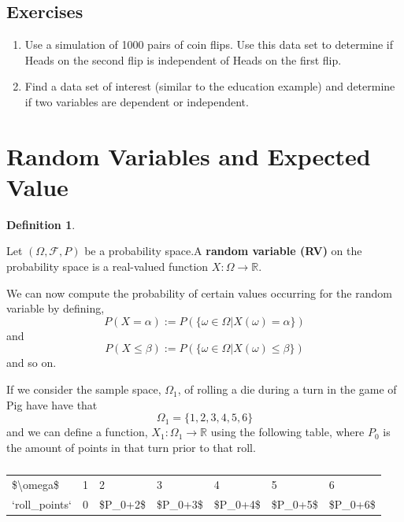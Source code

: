 \documentclass[
]{book}
\theoremstyle{definition}
\newtheorem{definition}{Definition}[chapter]
\theoremstyle{definition}
\theoremstyle{definition}
\theoremstyle{definition}
\theoremstyle{remark}
\begin{document}
\hypertarget{exercises-67}{%
\subsection{Exercises}\label{exercises-67}}

\begin{enumerate}
\def\labelenumi{\arabic{enumi}.}
\item
  Use a simulation of 1000 pairs of coin flips. Use this data set to determine if Heads on the second flip is independent of Heads on the first flip.
\item
  Find a data set of interest (similar to the education example) and determine if two variables are dependent or independent.
\end{enumerate}

\hypertarget{random-variables-and-expected-value}{%
\section{Random Variables and Expected Value}\label{random-variables-and-expected-value}}

\begin{definition}
\protect\hypertarget{def:unlabeled-div-314}{}\label{def:unlabeled-div-314}

Let \((\Omega, \mathcal{F}, P)\) be a probability space.A \textbf{random variable (RV)} on the probability space is a real-valued function \(X: \Omega \rightarrow \mathbb{R}\).

\end{definition}

We can now compute the probability of certain values occurring for the random variable by defining,
\[P(X=\alpha) := P(\{\omega \in \Omega \vert X(\omega)=\alpha \})\] and \[P(X\leq \beta) := P(\{\omega \in \Omega \vert X(\omega) \leq \beta\})\] and so on.

If we consider the sample space, \(\Omega_1\), of rolling a die during a turn in the game of Pig have have that
\[\Omega_1 = \{1,2,3,4,5,6\}\] and we can define a function, \(X_1:\Omega_1 \rightarrow \mathbb{R}\) using the following table, where \(P_0\) is the amount of points in that turn prior to that roll.

\begin{table}

\caption{\label{tab:unnamed-chunk-238}}
\centering
\begin{tabular}[t]{lllllll}
\toprule
  &  &  &  &  &  & \\
\midrule
\$\textbackslash{}omega\$ & 1 & 2 & 3 & 4 & 5 & 6\\
`roll\_points` & 0 & \$P\_0+2\$ & \$P\_0+3\$ & \$P\_0+4\$ & \$P\_0+5\$ & \$P\_0+6\$\\
\bottomrule
\end{tabular}
\end{table}
\end{document}
